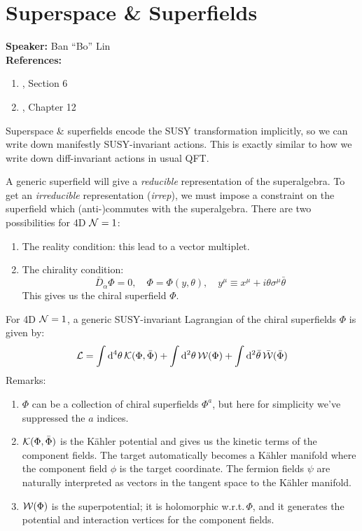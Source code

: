 \documentclass[a4paper
	,10pt
]{article}
\newcommand{\speaker}[1]{\noindent\textbf{Speaker:} #1}
\newcommand{\references}[1]{\noindent\textbf{References:} #1}
\begin{document}
\section{Superspace \& Superfields}
	\speaker{Ban ``Bo'' Lin}\\
	\references{
	\begin{enumerate}[noitemsep,topsep=0pt]
	\item \textcite{Argyres:1996abc}, Section 6
	\item \citetitle{Hori:2003ic} \cite{Hori:2003ic}, Chapter 12
	\end{enumerate}
	}\vspace{.5\baselineskip}
	
	Superspace \& superfields encode the SUSY transformation implicitly, so we can write down manifestly SUSY-invariant actions. This is exactly similar to how we write down diff-invariant actions in usual QFT.
	
	A generic superfield will give a \textit{reducible} representation of the superalgebra. To get an \textit{irreducible} representation (\textit{irrep}), we must impose a constraint on the superfield which (anti-)commutes with the superalgebra. There are two possibilities for 4D $\mathcal{N} = 1$:
	\begin{enumerate}[noitemsep]
	\item The reality condition: this lead to a vector multiplet.
	\item The chirality condition:
	\begin{equation}
		\bar{D}_{\dot{\alpha}} \Phi = 0,
	\quad
		\Phi = \Phi(y,\theta),
	\quad
		y^\mu \equiv x^\mu
			+ i\theta \sigma^\mu \bar{\theta}
	\end{equation}
	This gives us the chiral superfield $\Phi$. 
	\end{enumerate}
	
	For 4D $\mathcal{N} = 1$, a generic SUSY-invariant Lagrangian of the chiral superfields $\Phi$ is given by:
	\begin{equation}
		\mathcal{L}
		= \int \dd[4]{\theta} \mathcal{K}(\Phi, \bar{\Phi})
			+ \int \dd[2]{\theta}
				\mathcal{W}(\Phi)
			+ \int \dd[2]{\bar{\theta}}
				\bar{\mathcal{W}}(\bar{\Phi})
	\end{equation}
	Remarks:
	\begin{enumerate}
	\item $\Phi$ can be a collection of chiral superfields $\Phi^a$, but here for simplicity we've suppressed the $a$ indices.
	
	\item $\mathcal{K}(\Phi, \bar{\Phi})$ is the K\"ahler potential and gives us the kinetic terms of the component fields. The target automatically becomes a K\"ahler manifold where the component field $\phi$ is the target coordinate. The fermion fields $\psi$ are naturally interpreted as vectors in the tangent space to the K\"ahler manifold. 
	
	\item $\mathcal{W}(\Phi)$ is the superpotential; it is holomorphic w.r.t.\,$\Phi$, and it generates the potential and interaction vertices for the component fields. 
	\end{enumerate}
\end{document}
